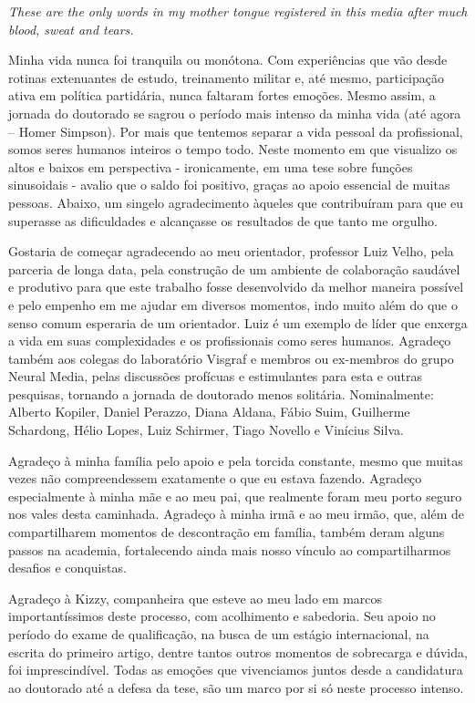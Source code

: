 \textit{These are the only words in my mother tongue registered in this media after much blood, sweat and tears.}

Minha vida nunca foi tranquila ou monótona. Com experiências que vão desde rotinas extenuantes de estudo, treinamento militar e, até mesmo, participação ativa em política partidária, nunca faltaram fortes emoções. Mesmo assim, a jornada do doutorado se sagrou o período mais intenso da minha vida (até agora – Homer Simpson). Por mais que tentemos separar a vida pessoal da profissional, somos seres humanos inteiros o tempo todo. Neste momento em que visualizo os altos e baixos em perspectiva - ironicamente, em uma tese sobre funções sinusoidais - avalio que o saldo foi positivo, graças ao apoio essencial de muitas pessoas. Abaixo, um singelo agradecimento àqueles que contribuíram para que eu superasse as dificuldades e alcançasse os resultados de que tanto me orgulho.

Gostaria de começar agradecendo ao meu orientador, professor Luiz Velho, pela parceria de longa data, pela construção de um ambiente de colaboração saudável e produtivo para que este trabalho fosse desenvolvido da melhor maneira possível e pelo empenho em me ajudar em diversos momentos, indo muito além do que o senso comum esperaria de um orientador. Luiz é um exemplo de líder que enxerga a vida em suas complexidades e os profissionais como seres humanos. Agradeço também aos colegas do laboratório Visgraf e membros ou ex-membros do grupo Neural Media, pelas discussões profícuas e estimulantes para esta e outras pesquisas, tornando a jornada de doutorado menos solitária. Nominalmente: Alberto Kopiler, Daniel Perazzo, Diana Aldana, Fábio Suim, Guilherme Schardong, Hélio Lopes, Luiz Schirmer, Tiago Novello e Vinícius Silva.

Agradeço à minha família pelo apoio e pela torcida constante, mesmo que muitas vezes não compreendessem exatamente o que eu estava fazendo. Agradeço especialmente à minha mãe e ao meu pai, que realmente foram meu porto seguro nos vales desta caminhada. Agradeço à minha irmã e ao meu irmão, que, além de compartilharem momentos de descontração em família, também deram alguns passos na academia, fortalecendo ainda mais nosso vínculo ao compartilharmos desafios e conquistas.

Agradeço à Kizzy, companheira que esteve ao meu lado em marcos importantíssimos deste processo, com acolhimento e sabedoria. Seu apoio no período do exame de qualificação, na busca de um estágio internacional, na escrita do primeiro artigo, dentre tantos outros momentos de sobrecarga e dúvida, foi imprescindível. Todas as emoções que vivenciamos juntos desde a candidatura ao doutorado até a defesa da tese, são um marco por si só neste processo intenso.

